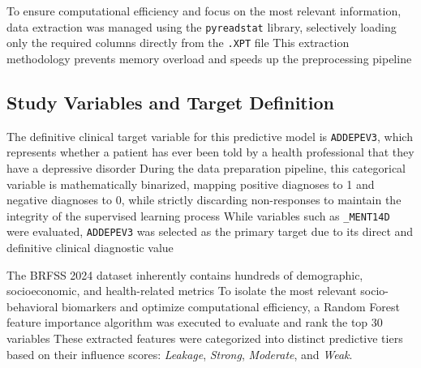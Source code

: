 \documentclass[conference]{IEEEtran}
\begin{document}
To ensure computational efficiency and focus on the most relevant information, data extraction was managed using the \texttt{pyreadstat} library, selectively loading only the required columns directly from the \texttt{.XPT} file %
This extraction methodology prevents memory overload and speeds up the preprocessing pipeline %

\subsection{Study Variables and Target Definition}

The definitive clinical target variable for this predictive model is \texttt{ADDEPEV3}, which represents whether a patient has ever been told by a health professional that they have a depressive disorder \cite{cdc2024brfss} %
During the data preparation pipeline, this categorical variable is mathematically binarized, mapping positive diagnoses to 1 and negative diagnoses to 0, while strictly discarding non-responses to maintain the integrity of the supervised learning process %
While variables such as \texttt{\_MENT14D} were evaluated, \texttt{ADDEPEV3} was selected as the primary target due to its direct and definitive clinical diagnostic value %

The BRFSS 2024 dataset inherently contains hundreds of demographic, socioeconomic, and health-related metrics %
To isolate the most relevant socio-behavioral biomarkers and optimize computational efficiency, a Random Forest feature importance algorithm was executed to evaluate and rank the top 30 variables %
These extracted features were categorized into distinct predictive tiers based on their influence scores: \textit{Leakage}, \textit{Strong}, \textit{Moderate}, and \textit{Weak}.
\end{document}
